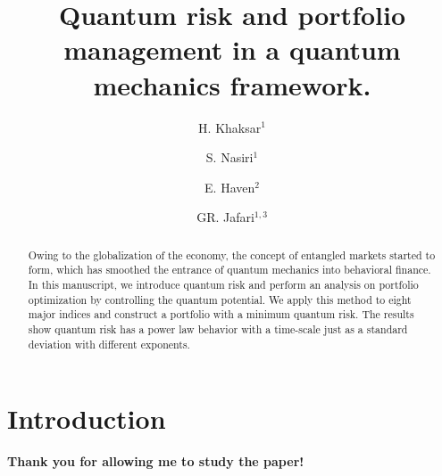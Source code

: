 \documentclass[ aip,jmp,reprint]{revtex4-2}
\begin{document}
\title{Quantum risk and portfolio management in \textbf{a }quantum mechanics
framework.}
\author{H. Khaksar$^1$}
\author{S. Nasiri$^1$}
\author{E. Haven$^2$}
\author{GR. Jafari$^{1,3}$}

\begin{abstract}
Owing to the globalization of the economy, the concept of entangled
markets started to form, which has smoothed the entrance of quantum
mechanics into behavioral finance. In this manuscript, we introduce
quantum risk and perform an analysis on portfolio
optimization by controlling the quantum potential. We apply this
method to eight major indices and construct a portfolio with a minimum
quantum risk. The results show quantum risk has a power law behavior with a
time-scale just as a standard deviation with different exponents.
\end{abstract}

\maketitle

\address{$1)$ Department of Physics, Shahid Beheshti University, G.C., Evin, Tehran 19839, Iran\\ 
	$2)$ Faculty of Business Administration, Memorial University, St. John's, Canada and IQSCS, UK\\ 
	$3)$ Department of Network and Data Science, Central European University }

\section{Introduction}

\textbf{Thank you for allowing me to study the paper!}
\end{document}
